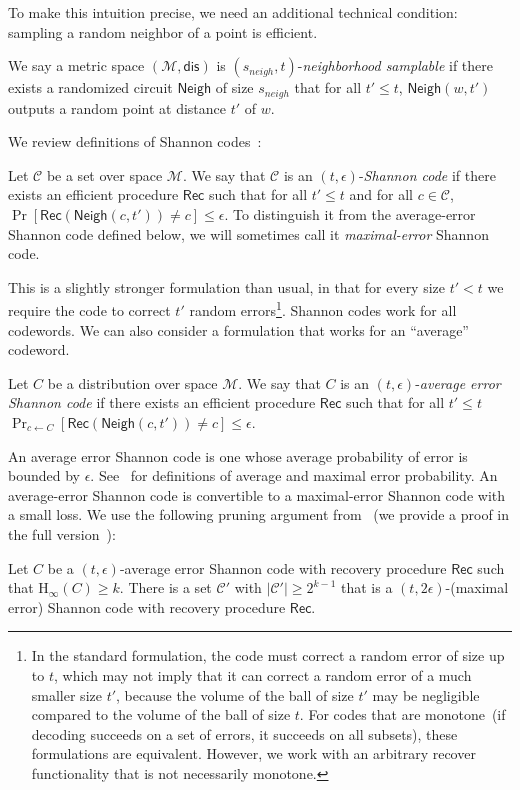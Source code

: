 \documentclass{llncs}
\newcommand{\class}[1]{{\ensuremath{\mathsf{#1}}}}
\newcommand{\rec}{\ensuremath{\class{Rec}}\xspace}
\newcommand{\neigh}{\ensuremath{\class{Neigh}}\xspace}
\newcommand{\dis}{\ensuremath{\mathsf{dis}}}
\newcommand{\Hoo}{\mathrm{H}_\infty}
\begin{document}
To make this intuition precise, we need an additional technical condition:  sampling a random neighbor of a point is efficient.
\begin{definition}
\label{def:neighborhood samplable}
We say a metric space $(\mathcal{M}, \dis)$ is $(s_{neigh}, t)$-\emph{neighborhood samplable} if there exists a randomized circuit $\neigh$ of size $s_{neigh}$ that for all $t'\leq t$, $\neigh (w, t')$ outputs a random point at distance $t'$ of $w$.  
\end{definition}

We review definitions of Shannon codes~\cite{shannon1949mathematical}:
\begin{definition}
\label{def:shannon-code}
Let $\mathcal{C}$ be a set over space $\mathcal{M}$.  We say that $\mathcal{C}$ is an $(t,\epsilon)$-\emph{Shannon code} if there exists an efficient procedure $\rec$ such that for all $t'\le t$ and for all $c\in \mathcal{C}$, $\Pr[\rec(\neigh(c, t')) \neq c]\le \epsilon$. To distinguish it from the average-error Shannon code defined below, we will sometimes call it \emph{maximal-error} Shannon code.
\end{definition}
This is a slightly stronger formulation than usual, in that for every size  $t'<t$ we require the code to correct $t'$ random errors\footnote{In the standard formulation, the code must correct a random error of size up to $t$, which may not imply that it can correct a random error of a much smaller size $t'$, because the volume of the ball of size $t'$ may be negligible compared to the volume of the ball of size $t$.  For codes that are monotone~(if decoding succeeds on a set of errors, it succeeds on all subsets), these formulations are equivalent.  However, we work with an arbitrary recover functionality that is not necessarily monotone.}.  
Shannon codes work for all codewords. We can also consider a formulation that works for an ``average'' codeword. 

 \begin{definition}
Let $C$ be a distribution over space $\mathcal{M}$.  We say that $C$ is an $(t,\epsilon)$-\emph{average error Shannon code} if there exists an efficient procedure $\rec$ such that for all $t'\le t$
$\Pr_{c\leftarrow C}[\rec(\neigh(c, t')) \neq c]\le \epsilon$.
\end{definition}
An average error Shannon code is one whose average probability of error is bounded by $\epsilon$.  See~\cite[Pages 192-194]{cover2006elements} for definitions of average and maximal error probability.  An average-error Shannon code is convertible to a maximal-error Shannon code with a small loss.  We use the following pruning argument from~\cite[Pages 202-204]{cover2006elements} (we provide a proof in the full version~\cite{fullerMengReyzin2013}):
\begin{lemma}
\label{lem:averageToMaximalError}
Let $C$ be a $(t, \epsilon)$-average error Shannon code with recovery procedure $\rec$ such that $\Hoo(C)\geq k$.  There is a set $\mathcal{C}'$ with $|\mathcal{C}'|\ge2^{k-1}$ that  is a $(t, 2\epsilon)$-(maximal error) Shannon code with recovery procedure $\rec$.
\end{lemma}
\end{document}
